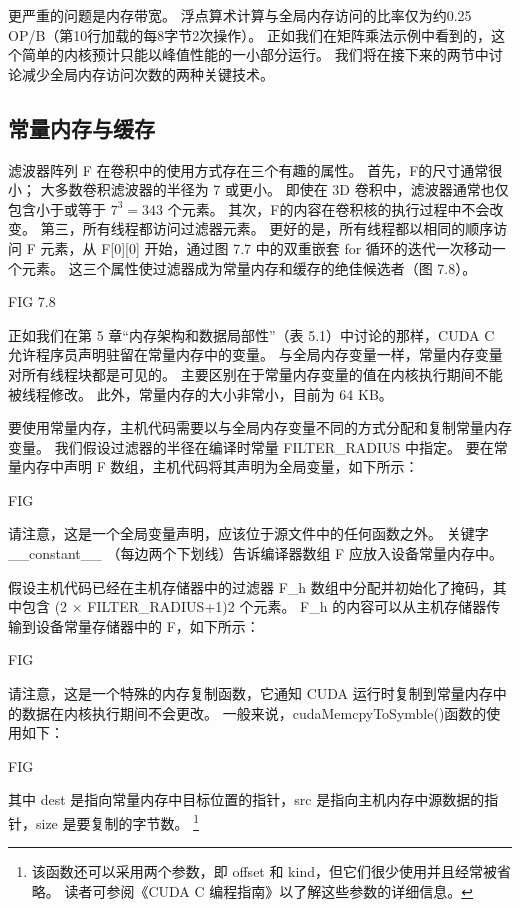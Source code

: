 更严重的问题是内存带宽。 浮点算术计算与全局内存访问的比率仅为约0.25 OP/B（第10行加载的每8字节2次操作）。 
正如我们在矩阵乘法示例中看到的，这个简单的内核预计只能以峰值性能的一小部分运行。 
我们将在接下来的两节中讨论减少全局内存访问次数的两种关键技术。

\subsection{常量内存与缓存}
滤波器阵列 F 在卷积中的使用方式存在三个有趣的属性。 首先，F的尺寸通常很小； 大多数卷积滤波器的半径为 7 或更小。 
即使在 3D 卷积中，滤波器通常也仅包含小于或等于 $7^3 = 343$ 个元素。 其次，F的内容在卷积核的执行过程中不会改变。 
第三，所有线程都访问过滤器元素。 
更好的是，所有线程都以相同的顺序访问 F 元素，从 F[0][0] 开始，通过图 7.7 中的双重嵌套 for 循环的迭代一次移动一个元素。 
这三个属性使过滤器成为常量内存和缓存的绝佳候选者（图 7.8）。

{\color{red} FIG 7.8}

正如我们在第 5 章“内存架构和数据局部性”（表 5.1）中讨论的那样，CUDA C 允许程序员声明驻留在常量内存中的变量。 
与全局内存变量一样，常量内存变量对所有线程块都是可见的。 主要区别在于常量内存变量的值在内核执行期间不能被线程修改。 
此外，常量内存的大小非常小，目前为 64 KB。

要使用常量内存，主机代码需要以与全局内存变量不同的方式分配和复制常量内存变量。 
我们假设过滤器的半径在编译时常量 FILTER\_RADIUS 中指定。 
要在常量内存中声明 F 数组，主机代码将其声明为全局变量，如下所示：

{\color{red} FIG}

请注意，这是一个全局变量声明，应该位于源文件中的任何函数之外。 
关键字 \_\_constant\_\_ （每边两个下划线）告诉编译器数组 F 应放入设备常量内存中。

假设主机代码已经在主机存储器中的过滤器 F\_h 数组中分配并初始化了掩码，其中包含 (2 × FILTER\_RADIUS+1)2 个元素。 
F\_h 的内容可以从主机存储器传输到设备常量存储器中的 F，如下所示：

{\color{red} FIG}

请注意，这是一个特殊的内存复制函数，它通知 CUDA 运行时复制到常量内存中的数据在内核执行期间不会更改。 
一般来说，cudaMemcpyToSymble()函数的使用如下：

{\color{red} FIG}

其中 dest 是指向常量内存中目标位置的指针，src 是指向主机内存中源数据的指针，size 是要复制的字节数。
\footnote{该函数还可以采用两个参数，即 offset 和 kind，但它们很少使用并且经常被省略。 
读者可参阅《CUDA C 编程指南》以了解这些参数的详细信息。}

